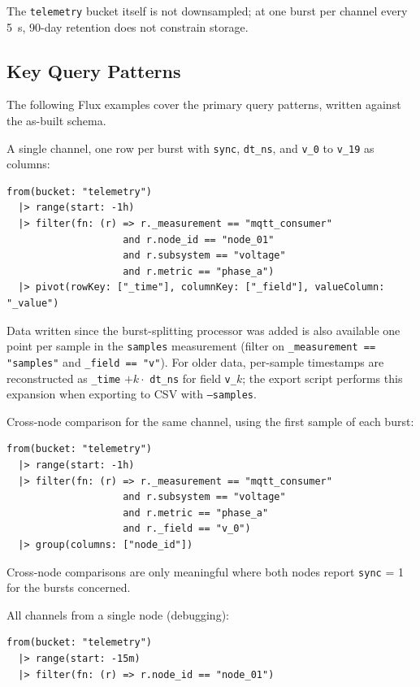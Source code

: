 The \texttt{telemetry} bucket itself is not downsampled; at one burst per channel every 5~s, 90-day retention does not constrain storage.

\subsection{Key Query Patterns}
\label{sec:queries}
The following Flux examples cover the primary query patterns, written against the as-built schema.

A single channel, one row per burst with \texttt{sync}, \texttt{dt\_ns}, and \texttt{v\_0} to \texttt{v\_19} as columns:
\begin{lstlisting}[language=flux]
from(bucket: "telemetry")
  |> range(start: -1h)
  |> filter(fn: (r) => r._measurement == "mqtt_consumer"
                    and r.node_id == "node_01"
                    and r.subsystem == "voltage"
                    and r.metric == "phase_a")
  |> pivot(rowKey: ["_time"], columnKey: ["_field"], valueColumn: "_value")
\end{lstlisting}
Data written since the burst-splitting processor was added is also available one point per sample in the \texttt{samples} measurement (filter on \texttt{\_measurement == "samples"} and \texttt{\_field == "v"}). For older data, per-sample timestamps are reconstructed as \texttt{\_time} $+ k \cdot$ \texttt{dt\_ns} for field \texttt{v\_}$k$; the export script  performs this expansion when exporting to CSV with \texttt{--samples}.

Cross-node comparison for the same channel, using the first sample of each burst:
\begin{lstlisting}[language=flux]
from(bucket: "telemetry")
  |> range(start: -1h)
  |> filter(fn: (r) => r._measurement == "mqtt_consumer"
                    and r.subsystem == "voltage"
                    and r.metric == "phase_a"
                    and r._field == "v_0")
  |> group(columns: ["node_id"])
\end{lstlisting}

Cross-node comparisons are only meaningful where both nodes report \texttt{sync} = 1 for the bursts concerned.

All channels from a single node (debugging):
\begin{lstlisting}[language=flux]
from(bucket: "telemetry")
  |> range(start: -15m)
  |> filter(fn: (r) => r.node_id == "node_01")
\end{lstlisting}

